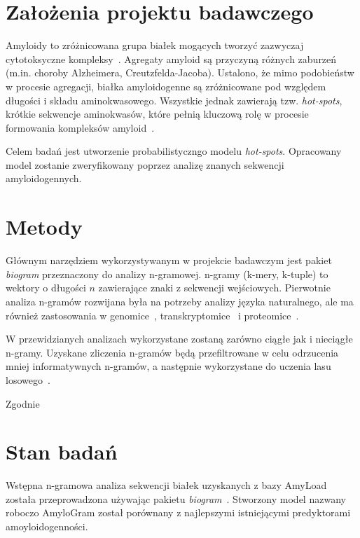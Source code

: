 \documentclass{article}
\author{Michał Burdukiewicz, Przemysław Gagat}
\title{Predykcja białek amyloidogennych \linebreak \vskip{} \large{Projekt badawczy Doktoranckiego Koła Naukowego Bioinformatyki}}
\date{}
\begin{document}
\maketitle

\section{Założenia projektu badawczego}

Amyloidy to zróżnicowana grupa białek mogących tworzyć zazwyczaj cytotoksyczne kompleksy~\citep{fandrich_oligomeric_2012}. Agregaty amyloid są przyczyną różnych zaburzeń (m.in. choroby Alzheimera, Creutzfelda-Jacoba). Ustalono, że mimo podobieństw w procesie agregacji, białka amyloidogenne są zróżnicowane pod względem długości i składu aminokwasowego. Wszystkie jednak zawierają tzw. \textit{hot-spots}, krótkie sekwencje aminokwasów, które pełnią kluczową rolę w procesie formowania kompleksów amyloid~\citep{breydo_structural_2015}.

Celem badań jest utworzenie probabilistyczngo modelu \textit{hot-spots}. Opracowany model zostanie zweryfikowany poprzez analizę znanych sekwencji amyloidogennych.


\section{Metody}

Głównym narzędziem wykorzystywanym w projekcie badawczym jest pakiet \textit{biogram} przeznaczony do analizy n-gramowej. n-gramy (k-mery, k-tuple) to wektory o długości $n$ zawierające znaki z sekwencji wejściowych. Pierwotnie analiza n-gramów rozwijana była na potrzeby analizy języka naturalnego, ale ma również zastosowania w genomice~\citep{fang2011}, transkryptomice~\citep{wang2014} i proteomice~\citep{guo2014}. 

W przewidzianych analizach wykorzystane zostaną zarówno ciągłe jak i nieciągłe n-gramy. Uzyskane zliczenia n-gramów będą przefiltrowane w celu odrzucenia mniej informatywnych n-gramów, a następnie wykorzystane do uczenia lasu losowego~\citep{liaw_classification_2002}.

Zgodnie

\section{Stan badań}

Wstępna n-gramowa analiza sekwencji białek uzyskanych z bazy AmyLoad\cite{wozniak_amyload:_2015} została przeprowadzona używając pakietu \textit{biogram}~\citep{burdukiewicz}. Stworzony model nazwany roboczo AmyloGram został porównany z najlepszymi istniejącymi predyktorami amoyloidogenności.
\end{document}

